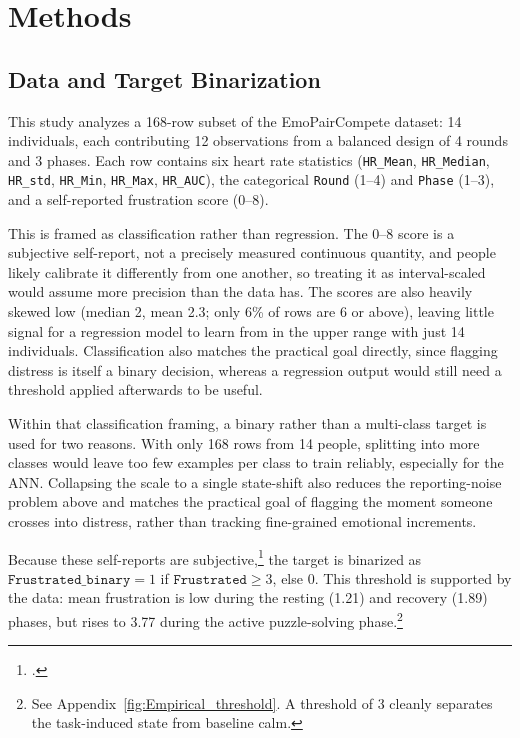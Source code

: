 \documentclass[11pt,a4paper]{article}
\begin{document}
\section{Methods}

\subsection{Data and Target Binarization}

This study analyzes a 168-row subset of the EmoPairCompete dataset: 14 individuals, each contributing 12 observations from a balanced design of 4 rounds and 3 phases. Each row contains six heart rate statistics (\texttt{HR\_Mean}, \texttt{HR\_Median}, \texttt{HR\_std}, \texttt{HR\_Min}, \texttt{HR\_Max}, \texttt{HR\_AUC}), the categorical \texttt{Round} (1--4) and \texttt{Phase} (1--3), and a self-reported frustration score (0--8).

This is framed as classification rather than regression. The 0--8 score is a subjective self-report, not a precisely measured continuous quantity, and people likely calibrate it differently from one another, so treating it as interval-scaled would assume more precision than the data has. The scores are also heavily skewed low (median 2, mean 2.3; only 6\% of rows are 6 or above), leaving little signal for a regression model to learn from in the upper range with just 14 individuals. Classification also matches the practical goal directly, since flagging distress is itself a binary decision, whereas a regression output would still need a threshold applied afterwards to be useful.

Within that classification framing, a binary rather than a multi-class target is used for two reasons. With only 168 rows from 14 people, splitting into more classes would leave too few examples per class to train reliably, especially for the ANN. Collapsing the scale to a single state-shift also reduces the reporting-noise problem above and matches the practical goal of flagging the moment someone crosses into distress, rather than tracking fine-grained emotional increments.

Because these self-reports are subjective,\footcite[Page 9, Paragraph 3 (under "Phase Analysis")]{das2024} the target is binarized as $\texttt{Frustrated\_binary} = 1$ if $\texttt{Frustrated} \geq 3$, else $0$. This threshold is supported by the data: mean frustration is low during the resting (1.21) and recovery (1.89) phases, but rises to 3.77 during the active puzzle-solving phase.\footnote{See Appendix~\ref{fig:Empirical_threshold}. A threshold of 3 cleanly separates the task-induced state from baseline calm.}
\end{document}
